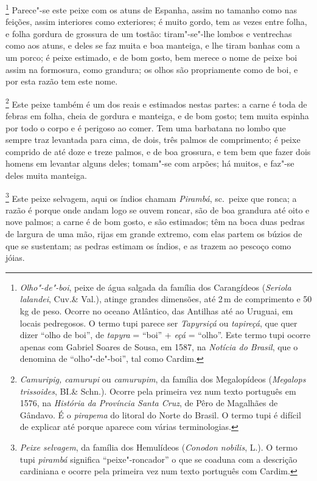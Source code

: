 \footnote{ \textit{Olho"-de"-boi}, peixe de água
salgada da família dos Carangídeos (\textit{Seriola lalandei}, Cuv.\&
Val.), atinge grandes dimensões, até 2\,m de comprimento e 50 kg de peso.
Ocorre no oceano Atlântico, das Antilhas até ao Uruguai, em locais
pedregosos. O termo tupi parece ser \textit{Tapyrsiçá} ou
\textit{tapireçá}, que quer dizer ``olho de boi'', de \textit{tapyra} = 
``boi'' + \textit{eçá} = ``olho''. Este termo tupi ocorre apenas com
Gabriel Soares de Sousa, em 1587, na \textit{Notícia do Brasil}, que o
denomina de ``olho"-de"-boi'', tal como Cardim.} 
Parece"-se este peixe com os atuns de Espanha, assim no tamanho como
nas feições, assim interiores como exteriores; é muito gordo, tem as
vezes entre folha, e folha gordura de grossura de um tostão:
tiram"-se"-lhe lombos e ventrechas como aos atuns, e deles se faz muita e
boa manteiga, e lhe tiram banhas com a um porco; é peixe estimado, e de
bom gosto, bem merece o nome de peixe boi assim na formosura, como
grandura; os olhos são propriamente como de boi, e por esta razão tem este nome.

\footnote{ \textit{Camuripig, camurupi} ou
\textit{camurupim}, da família dos Megalopídeos (\textit{Megalops
trissoides}, BI.\& Schn.). Ocorre pela primeira vez num texto português
em 1576, na \textit{História da Província Santa Cruz}, de Pêro de
Magalhães de Gândavo. É o \textit{pirapema} do litoral do Norte do Brasil.
O termo tupi é difícil de explicar até porque aparece com várias
terminologias.} Este peixe também é um dos reais e
estimados nestas partes: a carne é toda de febras em folha, cheia de
gordura e manteiga, e de bom gosto; tem muita espinha por todo o corpo
e é perigoso ao comer. Tem uma barbatana no lombo que sempre traz
levantada para cima, de dois, três palmos de comprimento; é peixe
comprido de até doze e treze palmos, e de boa grossura, e tem bem que
fazer dois homens em levantar alguns deles; tomam"-se com arpões; há
muitos, e faz"-se deles muita manteiga.

\footnote{ \textit{Peixe selvagem}, da família
dos Hemulídeos (\textit{Conodon nobilis}, L.). O termo tupi
\textit{pirambá} significa ``peixe"-roncador'' o que se coaduna com a
descrição cardiniana e ocorre pela primeira vez num texto português com
Cardim.} Este peixe selvagem, aqui os índios chamam
\textit{Pirambá}, sc.~peixe que ronca; a razão é porque onde andam
logo se ouvem roncar, são de boa grandura até oito e nove palmos; a 
carne é de bom gosto, e são estimados; têm na boca duas pedras de
largura de uma mão, rijas em grande extremo, com elas partem os búzios
de que se sustentam; as pedras estimam os índios, e as trazem ao
pescoço como jóias.

